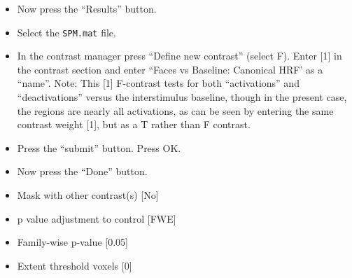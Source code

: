 \begin{itemize}
\item Now press the ``Results'' button.
\item Select the \texttt{SPM.mat} file.
\item In the contrast manager press ``Define new contrast'' (select F). Enter [1] in the contrast section and enter ``Faces vs Baseline: Canonical HRF' as a ``name''. Note: This [1] F-contrast tests for both ``activations'' and ``deactivations'' versus the interstimulus baseline, though in the present case, the regions are nearly all activations, as can be seen by entering the same contrast weight [1], but as a T rather than F contrast.
\item Press the ``submit'' button. Press OK.
\item Now press the ``Done'' button.
\item Mask with other contrast(s) [No]
\item p value adjustment to control [FWE]
\item Family-wise p-value [0.05]
\item Extent threshold {voxels} [0]
\end{itemize}

